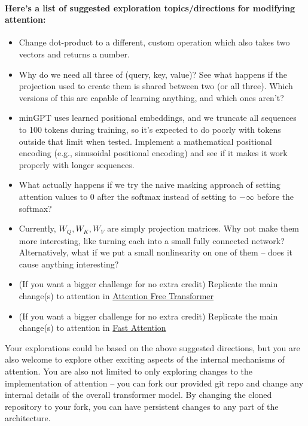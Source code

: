 \documentclass{article}
\begin{document}
    \paragraph{Here's a list of suggested exploration topics/directions for modifying attention:}
    \begin{itemize}
        \item Change dot-product to a different, custom operation which also
        takes two vectors and returns a number.
        \item Why do we need all three of (query, key, value)? See what happens
        if the projection used to create them is shared between two (or all
        three). Which versions of this are capable of learning anything, and
        which ones aren't?
        \item minGPT uses learned positional embeddings, and we truncate all
        sequences to 100 tokens during training, so it's expected to do poorly
        with tokens outside that limit when tested. Implement a mathematical
        positional encoding (e.g., sinusoidal positional encoding) and see if it
        makes it work properly with longer sequences.
        \item What actually happens if we try the naive masking approach of
        setting attention values to 0 after the softmax instead of setting to
        $-\infty$ before the softmax?
        \item Currently, $W_Q, W_K, W_V$ are simply projection matrices. Why not
        make them more interesting, like turning each into a small fully
        connected network? Alternatively, what if we put a small nonlinearity on
        one of them -- does it cause anything interesting?
        \item (If you want a bigger challenge for no extra credit) Replicate the
        main change(s) to attention in
        \textcolor{blue}{\href{https://arxiv.org/pdf/2105.14103.pdf}{Attention
        Free Transformer}}
        \item (If you want a bigger challenge for no extra credit) Replicate the
        main change(s) to attention in
        \textcolor{blue}{\href{https://ieeexplore.ieee.org/document/9265219}{Fast
        Attention}}
    \end{itemize}

    Your explorations could be based on the above suggested directions, but you
    are also welcome to explore other exciting aspects of the internal
    mechanisms of attention. You are also not limited to only exploring changes
    to the implementation of attention -- you can fork our provided git repo and
    change any internal details of the overall transformer model. By changing
    the cloned repository to your fork, you can have persistent changes to any
    part of the architecture.
\end{document}
